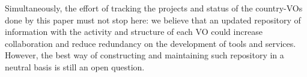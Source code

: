 Simultaneously, the effort of tracking the projects and status of the
country-VOs done by this paper must not stop here: we believe that an
updated repository of information with the activity and structure of
each VO could increase collaboration and reduce redundancy on the 
development of tools and services. However, the best way of constructing 
and maintaining such repository in a neutral basis is still an open question.


